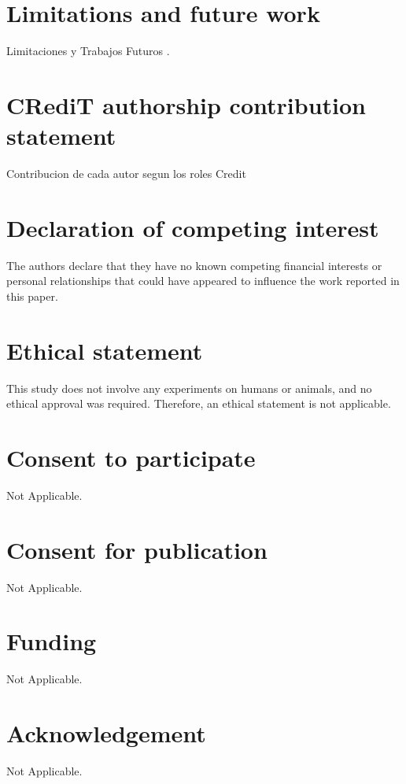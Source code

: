 \documentclass[5p]{elsarticle}
\begin{document}
\section{Limitations and future work}
\label{sec:limitations_future_work}
Limitaciones y Trabajos Futuros \cite{wikipedia1}.

\section*{CRediT authorship contribution statement}
\label{sec:authorship_contribution}
Contribucion de cada autor segun los roles Credit

\section*{Declaration of competing interest}
\label{sec:competing_interest}
The authors declare that they have no known competing financial interests or personal relationships that could have appeared to influence the work reported in this paper.

\section*{Ethical statement}
\label{sec:ethical_statement}
This study does not involve any experiments on humans or animals, and no ethical approval was required. Therefore, an ethical statement is not applicable.

\section*{Consent to participate}
\label{sec:consent_participate}
Not Applicable.

\section*{Consent for publication}
\label{sec:consent_publication}
Not Applicable.

\section*{Funding}
\label{sec:funding}
Not Applicable.

\section*{Acknowledgement}
\label{sec:acknowledgement}
Not Applicable.
\end{document}
